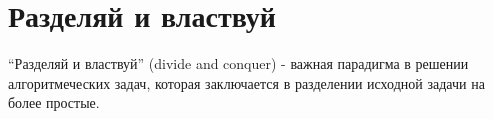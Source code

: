 \section{Разделяй и властвуй}
\label{addDivideAndConquer}
``Разделяй и властвуй'' (divide and conquer) - важная парадигма в
решении алгоритмеческих задач, которая заключается в разделении
исходной задачи на более простые.
